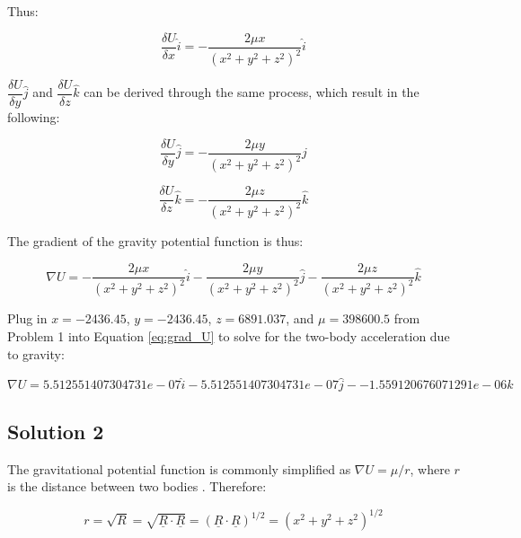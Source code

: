 \documentclass[conf]{new-aiaa}
\begin{document}
Thus: 

\begin{equation}
\dfrac{\delta U}{\delta x} \hat{i} = -\dfrac{2 \mu x}{ (x^2 + y^2 + z^2 )^2 } \hat{i}
\end{equation}

$\dfrac{\delta U}{\delta y} \hat{j} $ and $\dfrac{\delta U}{\delta z} \hat{k} $ can be derived through the same process, which result in the following: 

\begin{equation}
\dfrac{\delta U}{\delta y} \hat{j} = -\dfrac{2 \mu y}{ (x^2 + y^2 + z^2 )^2 } \hat{j}
\end{equation}

\begin{equation}
\dfrac{\delta U}{\delta z} \hat{k} = -\dfrac{2 \mu z}{ (x^2 + y^2 + z^2 )^2 } \hat{k}
\end{equation}

The gradient of the gravity potential function is thus: 

\begin{equation}
\nabla U = -\dfrac{2 \mu x}{ (x^2 + y^2 + z^2 )^2 } \hat{i} -\dfrac{2 \mu y}{ (x^2 + y^2 + z^2 )^2 } \hat{j} -\dfrac{2 \mu z}{ (x^2 + y^2 + z^2 )^2 } \hat{k}
\label{eq:grad_U}
\end{equation}

Plug in $x = -2436.45$, $y = -2436.45$, $z = 6891.037$, and $\mu = 398600.5$ from Problem 1 into Equation \ref{eq:grad_U} to solve for the two-body acceleration due to gravity: 

\begin{equation}
\nabla U = 5.512551407304731e-07 \hat{i} - 5.512551407304731e-07 \hat{j} - -1.559120676071291e-06 \hat{k} 
\end{equation}

\subsection{Solution 2}

The gravitational potential function is commonly simplified as $\nabla U = \mu/r$, where $r$ is the distance between two bodies \cite{bate_astrodynamics}. Therefore: 

\begin{equation}
r = \sqrt{R} = \sqrt{\underline{R} \cdot \underline{R}} = ( \underline{R} \cdot \underline{R} )^{1/2} = ( x^2 + y^2 + z^2 )^{1/2}
\label{eq:U_r}
\end{equation}
\end{document}
